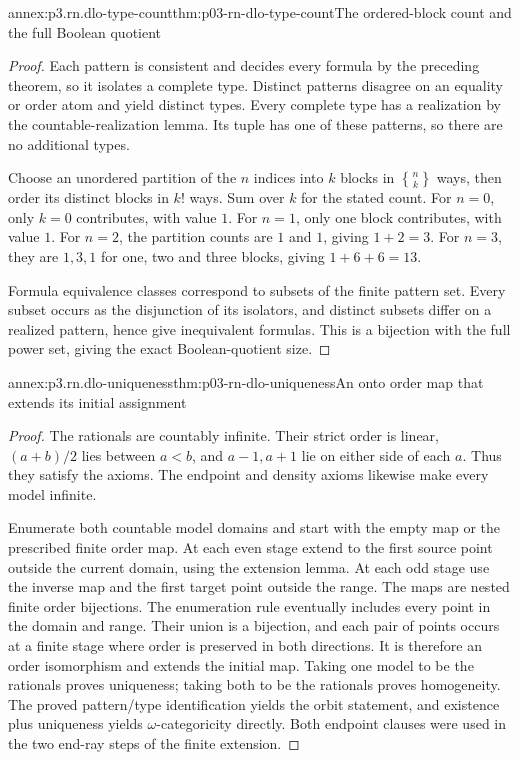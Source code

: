 \begin{annexitem}{annex:p3.rn.dlo-type-count}{thm:p03-rn-dlo-type-count}{The ordered-block count and the full Boolean quotient}
\begin{proof}
Each pattern is consistent and decides every formula
by the preceding theorem, so it isolates a complete
type. Distinct patterns disagree on an equality or
order atom and yield distinct types.
Every complete type has a realization by the
countable-realization lemma. Its tuple has one
of these patterns, so there are no additional types.

Choose an unordered partition of the \(n\) indices
into \(k\) blocks in \({n\brace k}\) ways, then order
its distinct blocks in \(k!\) ways.
Sum over \(k\) for the stated count.
For \(n=0\), only \(k=0\) contributes, with value \(1\).
For \(n=1\), only one block contributes, with value \(1\).
For \(n=2\), the partition counts are \(1\) and \(1\), giving
\(1+2=3\).
For \(n=3\), they are \(1,3,1\) for one, two and three
blocks, giving \(1+6+6=13\).

Formula equivalence classes correspond to subsets
of the finite pattern set. Every subset occurs as
the disjunction of its isolators, and distinct
subsets differ on a realized pattern, hence give
inequivalent formulas.
This is a bijection with the full power set,
giving the exact Boolean-quotient size.
\end{proof}
\end{annexitem}

\begin{annexitem}{annex:p3.rn.dlo-uniqueness}{thm:p03-rn-dlo-uniqueness}{An onto order map that extends its initial assignment}
\begin{proof}
The rationals are countably infinite. Their strict
order is linear, \((a+b)/2\) lies between \(a<b\),
and \(a-1,a+1\) lie on either side of each \(a\).
Thus they satisfy the axioms.
The endpoint and density axioms likewise make
every model infinite.

Enumerate both countable model domains and start
with the empty map or the prescribed finite order map.
At each even stage extend to the first source point
outside the current domain, using the extension lemma.
At each odd stage use the inverse map and the first
target point outside the range.
The maps are nested finite order bijections.
The enumeration rule eventually includes every
point in the domain and range.
Their union is a bijection, and each pair of points
occurs at a finite stage where order is preserved
in both directions.
It is therefore an order isomorphism and extends
the initial map.
Taking one model to be the rationals proves
uniqueness; taking both to be the rationals proves
homogeneity.
The proved pattern/type identification yields the
orbit statement, and existence plus uniqueness yields
\(\omega\)-categoricity directly.
Both endpoint clauses were used in the two end-ray
steps of the finite extension.
\end{proof}
\end{annexitem}

